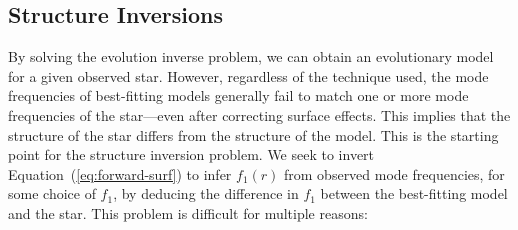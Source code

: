 \subsection{Structure Inversions} 
By solving the evolution inverse problem, we can obtain an evolutionary model for a given observed star. 
However, regardless of the technique used, the mode frequencies of best-fitting models generally fail to match one or more mode frequencies of the star---even after correcting surface effects. 
This implies that the structure of the star differs from the structure of the model. 
This is the starting point for the structure inversion problem. 
We seek to invert Equation~(\ref{eq:forward-surf}) to infer ${f_1(r)}$ from observed mode frequencies, for some choice of $f_1$, by deducing the difference in $f_1$ between the best-fitting model and the star. 
This problem is difficult for multiple reasons: 
